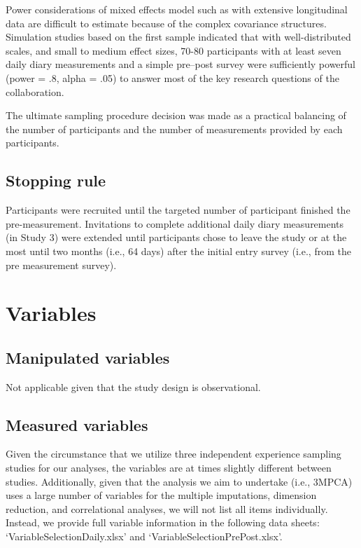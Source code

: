 \documentclass[]{article}
\newcounter{question}
\begin{document}
Power considerations of mixed effects model such as with extensive
longitudinal data are difficult to estimate because of the complex
covariance structures. Simulation studies based on the first sample
indicated that with well-distributed scales, and small to medium effect
sizes, 70-80 participants with at least seven daily diary measurements
and a simple pre--post survey were sufficiently powerful (power = .8,
alpha = .05) to answer most of the key research questions of the
collaboration.

The ultimate sampling procedure decision was made as a practical
balancing of the number of participants and the number of measurements
provided by each participants.

\hypertarget{stopping-rule}{%
\subsection{Stopping rule}\label{stopping-rule}}

Participants were recruited until the targeted number of participant
finished the pre-measurement. Invitations to complete additional daily
diary measurements (in Study 3) were extended until participants chose
to leave the study or at the most until two months (i.e., 64 days) after
the initial entry survey (i.e., from the pre measurement survey).

\hypertarget{variables}{%
\section{Variables}\label{variables}}

\hypertarget{manipulated-variables}{%
\subsection{Manipulated variables}\label{manipulated-variables}}

Not applicable given that the study design is observational.

\hypertarget{measured-variables}{%
\subsection{Measured variables}\label{measured-variables}}

Given the circumstance that we utilize three independent experience
sampling studies for our analyses, the variables are at times slightly
different between studies. Additionally, given that the analysis we aim
to undertake (i.e., 3MPCA) uses a large number of variables for the
multiple imputations, dimension reduction, and correlational analyses,
we will not list all items individually. Instead, we provide full
variable information in the following data sheets:
`VariableSelectionDaily.xlsx' and `VariableSelectionPrePost.xlsx'.
\end{document}
